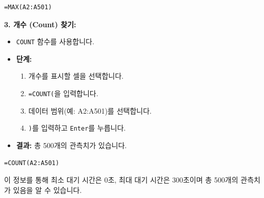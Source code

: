 \documentclass[11pt,a4paper]{article}
\theoremstyle{definition}
\begin{document}
\begin{tcolorbox}[title={최소값, 최대값, 개수 찾기 (Finding Min, Max, Count)}]
\begin{lstlisting}[caption={Excel MAX 함수 사용 예시}, label={lst:excel_max}]
=MAX(A2:A501)
\end{lstlisting}

\textbf{3. 개수 (Count) 찾기:}
\begin{itemize}
    \item \texttt{COUNT} 함수를 사용합니다.
    \item \textbf{단계:}
    \begin{enumerate}
        \item 개수를 표시할 셀을 선택합니다.
        \item \texttt{=COUNT(}을 입력합니다.
        \item 데이터 범위(예: A2:A501)를 선택합니다.
        \item \texttt{)}를 입력하고 \texttt{Enter}를 누릅니다.
    \end{enumerate}
    \item \textbf{결과:} 총 500개의 관측치가 있습니다.
\end{itemize}

\begin{lstlisting}[caption={Excel COUNT 함수 사용 예시}, label={lst:excel_count}]
=COUNT(A2:A501)
\end{lstlisting}

\begin{center}
\label{fig:excel_min_max_count_results}
\end{center}
이 정보를 통해 최소 대기 시간은 0초, 최대 대기 시간은 300초이며 총 500개의 관측치가 있음을 알 수 있습니다.
\end{tcolorbox}
\end{document}
